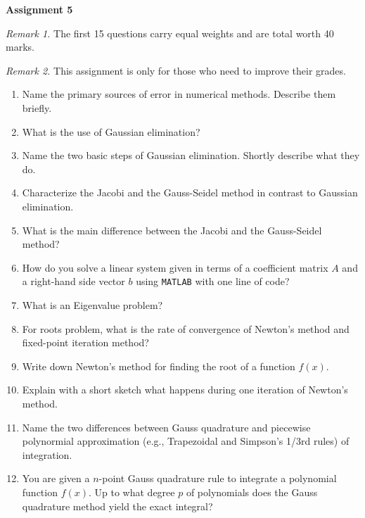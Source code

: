 \documentclass[11pt,a4paper]{article}
\begin{document}
\begin{center} 
\textbf{\Large Assignment 5} 
\end{center}

\noindent\textit{Remark 1.} The first 15 questions carry equal weights and are total worth 40 marks.

\noindent\textit{Remark 2.} This assignment is only for those who need to improve their grades. 

\begin{enumerate}
\item Name the primary sources of error in numerical methods. Describe them briefly.

\item What is the use of Gaussian elimination? 

\item Name the two basic steps of Gaussian elimination.  Shortly describe what they do.

\item Characterize the Jacobi and the Gauss-Seidel method in contrast to Gaussian elimination.

\item What is the main difference between the Jacobi and the Gauss-Seidel method?

\item How do you solve a linear system given in terms of a coefficient matrix $A$ and a right-hand side vector $b$ using \texttt{MATLAB} with one line of code?

\item What is an Eigenvalue problem?

\item For roots problem, what is the rate of convergence of Newton's method and fixed-point iteration method?

\item Write down Newton's method for finding the root of a function $f(x)$.

\item Explain with a short sketch what happens during one iteration of Newton's method.

\item Name the two differences between Gauss quadrature and piecewise polynormial approximation (e.g., Trapezoidal and Simpson's 1/3rd rules) of integration.

\item You are given a $n$-point Gauss quadrature rule to integrate a polynomial function $f(x)$. Up to what degree $p$ of polynomials does the Gauss quadrature method yield the exact integral?


\end{enumerate}
\end{document}
